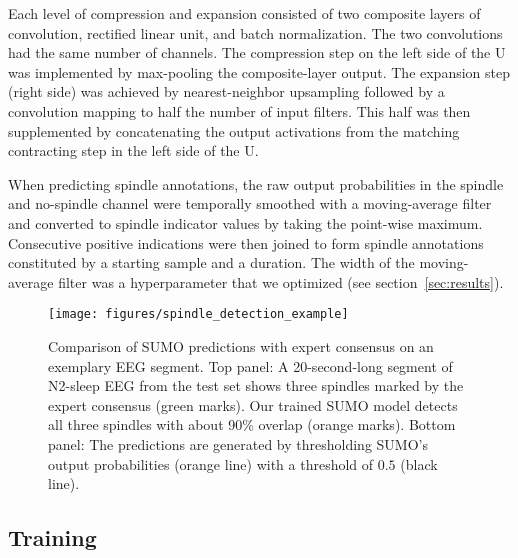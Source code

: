 \documentclass[fleqn,twocolumn,10pt]{wlscirep}
\begin{document}
Each level of compression and expansion consisted of two composite layers of
convolution\cite{Krizhevsky2012}, rectified linear unit\cite{Nair2010}, and
batch normalization\cite{Ioffe2015}.  The two convolutions had the same number
of channels.  The compression step on the left side of the U was implemented by
max-pooling the composite-layer output.  The expansion step (right side)
was achieved by nearest-neighbor upsampling followed by a convolution mapping to
half the number of input filters.  This half was then supplemented by
concatenating the output activations from the matching contracting step in the
left side of the U.

When predicting spindle annotations, the raw output probabilities in the spindle
and no-spindle channel were temporally smoothed with a moving-average filter and converted to spindle
indicator values by taking the point-wise maximum.  Consecutive positive
indications were then joined to form spindle annotations constituted by a
starting sample and a duration.
The width of the moving-average filter was a hyperparameter that we
optimized (see section~\ref{sec:results}).

\begin{figure*}[t]
	\centering
	\texttt{[image: figures/spindle\_detection\_example]}
	\caption{
		Comparison of SUMO predictions with expert consensus on an
		exemplary EEG segment.  Top panel: A 20-second-long segment of
		N2-sleep EEG from the test set shows three spindles marked by
		the expert consensus (green marks).  Our trained SUMO model
		detects all three spindles with about 90\% overlap (orange marks).
		Bottom panel: The predictions are generated by thresholding
		SUMO's output probabilities (orange line) with a threshold of
		$0.5$ (black line).
	}
	\label{fig:spindle-detection-example}
\end{figure*}

\subsection{Training}
\end{document}
